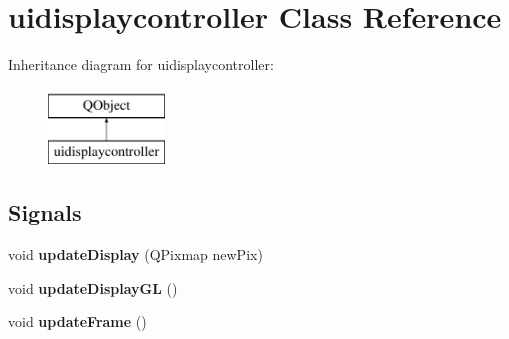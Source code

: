 \hypertarget{classuidisplaycontroller}{}\section{uidisplaycontroller Class Reference}
\label{classuidisplaycontroller}
Inheritance diagram for uidisplaycontroller\+:\begin{figure}[H]
\begin{center}
\leavevmode
\includegraphics[height=2.000000cm]{classuidisplaycontroller}
\end{center}
\end{figure}
\subsection*{Signals}
\begin{DoxyCompactItemize}
\item 
\mbox{\label{classuidisplaycontroller_a2a21f3b446ecc46ee007e127ef7b9973}} 
void {\bfseries update\+Display} (Q\+Pixmap new\+Pix)
\item 
\mbox{\label{classuidisplaycontroller_abd5521266f7a6b38b600b4b568f8bfc3}} 
void {\bfseries update\+Display\+GL} ()
\item 
\mbox{\label{classuidisplaycontroller_a736108f2d3d6d505dca9e3ea523b9561}} 
void {\bfseries update\+Frame} ()
\end{DoxyCompactItemize}
